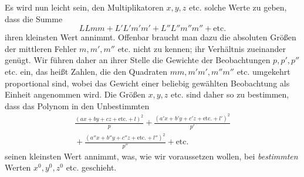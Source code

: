 Es wird nun leicht sein, den Multiplikatoren \(x,y,z\) etc. solche Werte zu geben, dass die Summe
\[
LLmm+L'L'm'm'+L''L''m''m''+\text{etc.}
\]
ihren kleinsten Wert annimmt. Offenbar braucht man dazu die absoluten Größen der mittleren Fehler \(m,m',m''\) etc. nicht zu kennen; ihr Verhältnis zueinander genügt. Wir führen daher an ihrer Stelle die Gewichte der Beobachtungen \(p,p',p''\) etc. ein, das heißt Zahlen, die den Quadraten \(mm,m'm',m''m''\) etc. umgekehrt proportional sind, wobei das Gewicht einer beliebig gewählten Beobachtung als Einheit angenommen wird. Die Größen \(x,y,z\) etc. sind daher so zu bestimmen, dass das Polynom in den Unbestimmten
\[
\begin{gathered}
\frac{(ax+by+cz+\text{etc.}+l)^2}{p}+\frac{(a'x+b'y+c'z+\text{etc.}+l')^2}{p'}\\[4pt]
{}+\frac{(a''x+b''y+c''z+\text{etc.}+l'')^2}{p''}+\text{etc.}
\end{gathered}
\]
seinen kleinsten Wert annimmt, was, wie wir voraussetzen wollen, bei \textit{bestimmten} Werten \(x^0,y^0,z^0\) etc. geschieht.

